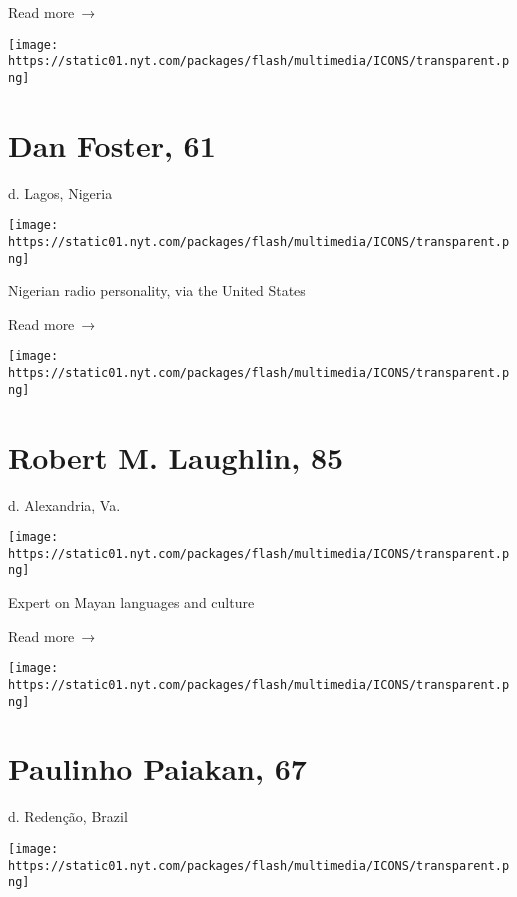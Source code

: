  Read more~→

\href{https://www.nytimes.com/2020/06/24/obituaries/dan-foster-dead-coronavirus.html}{}

\texttt{[image: https://static01.nyt.com/packages/flash/multimedia/ICONS/transparent.png]}

\hypertarget{dan-foster-61}{%
\section{Dan Foster, 61}\label{dan-foster-61}}

d. Lagos, Nigeria

\texttt{[image: https://static01.nyt.com/packages/flash/multimedia/ICONS/transparent.png]}

Nigerian radio personality, via the United States

 Read more~→

\href{https://www.nytimes.com/2020/06/24/science/robert-laughlin-preserver-of-a-mayan-language-dies-at-85.html}{}

\texttt{[image: https://static01.nyt.com/packages/flash/multimedia/ICONS/transparent.png]}

\hypertarget{robert-m-laughlin-85}{%
\section{Robert M. Laughlin, 85}\label{robert-m-laughlin-85}}

d. Alexandria, Va.

\texttt{[image: https://static01.nyt.com/packages/flash/multimedia/ICONS/transparent.png]}

Expert on Mayan languages and culture

 Read more~→

\href{https://www.nytimes.com/2020/06/23/obituaries/paulinho-paiakan-dead-indigenous-activist.html}{}

\texttt{[image: https://static01.nyt.com/packages/flash/multimedia/ICONS/transparent.png]}

\hypertarget{paulinho-paiakan-67}{%
\section{Paulinho Paiakan, 67}\label{paulinho-paiakan-67}}

d. Redenção, Brazil

\texttt{[image: https://static01.nyt.com/packages/flash/multimedia/ICONS/transparent.png]}

